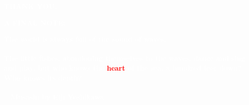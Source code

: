 \documentclass[12pt]{report}
\begin{document}
\begin{adjustbox}{minipage=10cm,scale={2}{3}}

       \textbf{\fontsize{30}{30}\selectfont \textcolor{white}{THANK YOU.}}\newline
\\

\end{adjustbox}

       \smallskip 

       \vspace{0.5in}

       {\selectfont \textbf{\Large \textcolor{white}{A FINAL NOTE: }}}

    \vspace{2cm}

        {\selectfont\textbf{\large \textcolor{white}{The world is always full of the sound of waves.\\ \\ The little fishes, abandoning themselves to the waves, dance and sing and play, but who knows the \textcolor{red}{heart} of the sea, a hundred feet down? Who knows its depth? \\ \\ -- Musashi by Eiji Yoshikawa}}}
    
\end{document}
